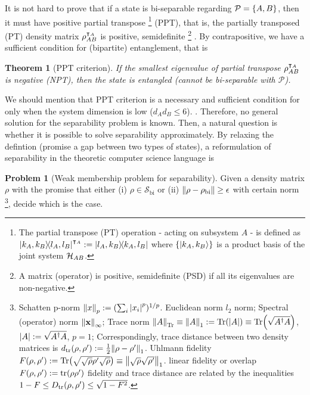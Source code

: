 \documentclass[
aps,
pra,
twocolumn,
floatfix,
]{revtex4-2}
\theoremstyle{plain}
\newtheorem{theorem}{Theorem}
\theoremstyle{definition}
\newtheorem{problem}{Problem}
\newcommand{\dm}{\rho}
\newcommand{\bi}{\text{bi}}
\newcommand{\ppt}{\textup{PPT}}
\newcommand{\separable}{\mathcal{S}}
\newcommand{\ppartition}{\mathcal{P}}
\begin{document}
It is not hard to prove that if a state is bi-separable regarding $\ppartition=\qty{A,B}$, then it must have positive partial transpose 
\footnote{
	The partial transpose (PT) operation - acting on subsystem $A$ - is defined as
		$\op{k_A,k_B}{l_A,l_B}^{\intercal_A} := \op{l_A,k_B}{k_A,l_B}$
	where $\qty{\ket{k_A,k_B}}$ is a product basis of the joint system $\mathcal{H}_{AB}$.
} (PPT), 
that is, the partially transposed (PT) density matrix $\dm_{AB}^{\T_A}$ is positive, semidefinite \footnote{A matrix (operator) is positive, semidefinite (PSD) if all its eigenvalues are non-negative.} \cite{peresSeparabilityCriterionDensity1996} \cite{horodeckiSeparabilityMixedStates1996}.
By contrapositive, we have a sufficient condition for (bipartite) entanglement, that is
\begin{theorem}[PPT criterion]\label{thm:ppt}
	If the smallest eigenvalue of partial transpose $\dm_{AB}^{\T_A}$ is negative (NPT), then the state is entangled (cannot be bi-separable with $\ppartition$).
\end{theorem}
We should mention that PPT criterion is a necessary and sufficient condition for  only when the system dimension is low ($d_A d_B \le 6$). \cite{horodeckiSeparabilityMixedStates1996}.
Therefore, no general solution for the separability problem is known.
Then, a natural question is whether it is possible to solve separability approximately.
By relaxing the defintion (promise a gap between two types of states), a reformulation of separability in the theoretic computer science language is
\begin{problem}[Weak membership problem for separability]\label{prm:weak_membership problem_for_separability}
	Given a density matrix $\dm$ with the promise that either (i) $\dm\in \separable_{\bi}$ or (ii) $\norm{\dm-\dm_{\bi}}\ge \epsilon$ with certain norm 
	\footnote{
		Schatten p-norm $\norm{x}_p:= (\sum_i \abs{x_i}^p)^{1/p}$.
		Euclidean norm $l_2$ norm;
		Spectral (operator) norm $\norm{\vb{x}}_{\infty}$;
		Trace norm $\norm{A}_{\Tr}\equiv\norm{A}_{1}:=\Tr(\abs{A})\equiv\Tr(\sqrt{A^\dagger A})$, $\abs{A}:=\sqrt{A^\dagger A}$, $p=1$;
		Correspondingly, trace distance between two density matrices is $d_{\tr}(\dm,\dm') : = \frac{1}{2} \norm{\dm-\dm'}_1$.
		Uhlmann fidelity $F(\dm,\dm') : = \Tr(\sqrt{\sqrt{\dm}\dm'\sqrt{\dm}})\equiv\norm{\sqrt{\dm}\sqrt{\dm'}}_1$.
		linear fidelity or overlap $F(\dm,\dm'):=\tr(\dm\dm')$
		fidelity and trace distance are related by the inequalities
		$1-F\le D_{\tr}(\dm,\dm') \le \sqrt{1-F^2}$.
	}, decide which is the case.
\end{problem}
\end{document}
